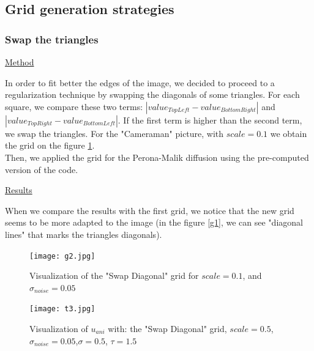 \documentclass{report}
\begin{document}
\subsection{Grid generation strategies}


\subsubsection{Swap the triangles}
\underline{Method}

In order to fit better the edges of the image, we decided to proceed to a regularization technique by swapping the diagonals of some triangles. 
For each square, we compare these two terms:
$|value_{Top Left} - value_{Bottom Right}|$ and $|value_{Top Right}- value_{Bottom Left}|$. If the first term is higher than the second term, we swap the triangles. For the "Cameraman" picture, with $scale=0.1$ we obtain the grid on the figure \ref{g2}. \\

Then, we applied the grid for the Perona-Malik diffusion using the pre-computed version of the code. 






\underline{Results}

When we compare the results with the first grid, we notice that the new grid seems to be more adapted to the image (in the figure \ref{g1}, we can see "diagonal lines" that marks the triangles diagonals). \\

        \begin{figure}
        	\label{g2}
        	\centering
        	\caption{Visualization of the "Swap Diagonal" grid for $scale=0.1$, and $\sigma_{noise}=0.05$}
        	\texttt{[image: g2.jpg]}
        \end{figure}


        \begin{figure}
        \label{t3}
        \centering
        \caption{Visualization of $u_{ani}$ with: the "Swap Diagonal" grid, $scale=0.5$, $\sigma_{noise}=0.05$,$\sigma=0.5$, $\tau=1.5$}
        \texttt{[image: t3.jpg]}
        \end{figure}
\end{document}
